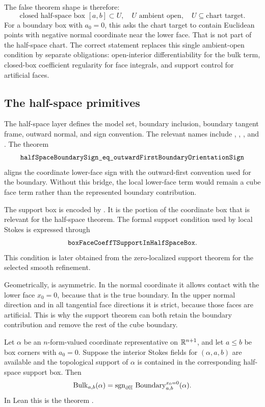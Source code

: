 The false theorem shape is therefore:
\[
  \text{closed half-space box }[a,b]\subset U,\quad
  U\text{ ambient open},\quad U\subseteq\text{chart target}.
\]
For a boundary box with \(a_0=0\), this asks the chart target to contain
Euclidean points with negative normal coordinate near the lower face.  That is
not part of the half-space chart.  The correct statement replaces this single
ambient-open condition by separate obligations: open-interior differentiability
for the bulk term, closed-box coefficient regularity for face integrals, and
support control for artificial faces.

\subsection{The half-space primitives}

The half-space layer defines the model set, boundary inclusion, boundary
tangent frame, outward normal, and sign convention.  The relevant names include
, ,
, and .
The theorem
\[
\code{halfSpaceBoundarySign_eq_outwardFirstBoundaryOrientationSign}
\]
aligns the coordinate lower-face sign with the outward-first convention used
for the boundary.  Without this bridge, the local lower-face term would remain
a cube face term rather than the represented boundary contribution.

The support box is encoded by .  It is the portion of
the coordinate box that is relevant for the half-space theorem.  The formal
support condition used by local Stokes is expressed through
\[
\code{boxFaceCoeffTSupportInHalfSpaceBox}.
\]
This condition is later obtained from the zero-localized support theorem for
the selected smooth refinement.

Geometrically,  is asymmetric.  In the normal
coordinate it allows contact with the lower face \(x_0=0\), because that is
the true boundary.  In the upper normal direction and in all tangential face
directions it is strict, because those faces are artificial.  This is why the
support theorem can both retain the boundary contribution and remove the rest
of the cube boundary.

\begin{theorem}
\label{thm:halfspace-local}
Let \(\alpha\) be an \(n\)-form-valued coordinate representative on
\(\mathbb{R}^{n+1}\), and let \(a\le b\) be box corners with \(a_0=0\).  Suppose the
interior Stokes fields for \((\alpha,a,b)\) are available and the topological
support of \(\alpha\) is contained in the corresponding half-space support box.
Then
\[
  \operatorname{Bulk}_{a,b}(\alpha)
  =
  \operatorname{sgn}_{\partial\mathbb{H}}\,
  \operatorname{Boundary}_{a,b}^{x_0=0}(\alpha).
\]
In Lean this is the theorem
.
\end{theorem}

